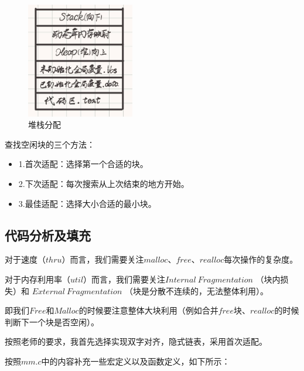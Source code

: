 \begin{figure} [H]
    \centering
    \includegraphics[width=0.42\textwidth]{Stack.jpg}
    \caption{堆栈分配} 
\end{figure}

查找空闲块的三个方法：
\begin{itemize}
    \item 1.首次适配：选择第一个合适的块。
    \item 2.下次适配：每次搜索从上次结束的地方开始。
    \item 3.最佳适配：选择大小合适的最小块。
\end{itemize}

\subsection{代码分析及填充}
对于速度（$thru$）而言，我们需要关注$malloc$、$free$、$realloc$每次操作的复杂度。

对于内存利用率（$util$）而言，我们需要关注$Internal \ Fragmentation$ （块内损失）和 $External \ Fragmentation$ （块是分散不连续的，无法整体利用）。

即我们$Free$和$Malloc$的时候要注意整体大块利用（例如合并$free$块、$realloc$的时候判断下一个块是否空闲）。

按照老师的要求，我首先选择实现双字对齐，隐式链表，采用首次适配。

按照$mm.c$中的内容补充一些宏定义以及函数定义，如下所示：

